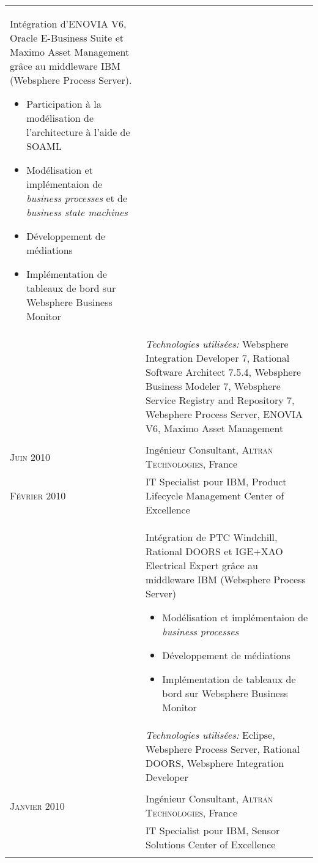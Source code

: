 \begin{longtable}{R{2.5cm}|p{14.8cm}}
 	\footnotesize{
 		Intégration d'ENOVIA V6, Oracle E-Business Suite et Maximo Asset Management grâce au middleware IBM (Websphere Process Server).
 	 	\begin{itemize}
			\item Participation à la modélisation de l'architecture à l'aide de SOAML
			\item Modélisation et implémentaion de \emph{business processes} et de \emph{business state machines}
			\item Développement de médiations
			\item Implémentation de tableaux de bord sur Websphere Business Monitor
		\end{itemize}
		\vspace{-1em}
 	}\\&
 	\footnotesize{\emph{Technologies utilisées:} Websphere Integration Developer 7, Rational Software Architect 7.5.4, Websphere Business Modeler 7, Websphere Service Registry and Repository 7, 
 	Websphere Process Server, ENOVIA V6, Maximo Asset Management }\\
  \\
 	\textsc{Juin 2010} & Ingénieur Consultant, \textsc{Altran Technologies}, France\\
 	\textsc{Février 2010}&IT Specialist pour IBM, Product Lifecycle Management Center of Excellence\\&
 	\footnotesize{
 		Intégration de PTC Windchill, Rational DOORS et IGE+XAO Electrical Expert grâce au middleware IBM (Websphere Process Server)
 		\begin{itemize}
			\item Modélisation et implémentaion de \emph{business processes}
			\item Développement de médiations
			\item Implémentation de tableaux de bord sur Websphere Business Monitor
		\end{itemize}
		\vspace{-1em}
 	}\\&
 	\footnotesize{\emph{Technologies utilisées:} Eclipse, Websphere Process Server, Rational DOORS, Websphere Integration Developer }\\
  \\
 	\textsc{Janvier 2010} & Ingénieur Consultant, \textsc{Altran Technologies}, France\\
 	& IT Specialist pour IBM, Sensor Solutions Center of Excellence\\&
 	\footnotesize{
}
\end{longtable}
